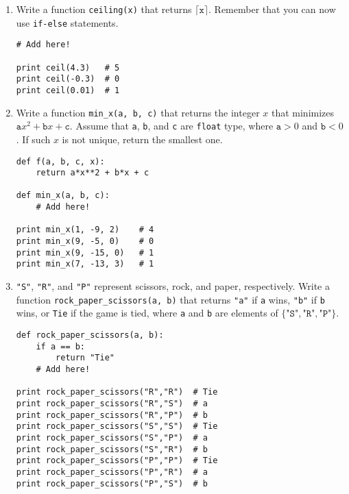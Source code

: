 \documentclass[../main.tex]{subfiles}
\begin{document}
\begin{enumerate}
\item Write a function \texttt{ceiling(x)} that returns $\lceil\texttt{x}\rceil$.
Remember that you can now use \texttt{if-else} statements.
\begin{verbatim}
# Add here!

print ceil(4.3)   # 5
print ceil(-0.3)  # 0
print ceil(0.01)  # 1
\end{verbatim}

\item Write a function \texttt{min\_x(a, b, c)} that returns the integer $x$ that minimizes $\texttt{a}x^2 + \texttt{b}x + \texttt{c}$.
Assume that \texttt{a}, \texttt{b}, and \texttt{c} are \texttt{float} type, where $\texttt{a} > 0$ and $\texttt{b} < 0$.
If such $x$ is not unique, return the smallest one.
\begin{verbatim}
def f(a, b, c, x):
	return a*x**2 + b*x + c

def min_x(a, b, c):
	# Add here!
	
print min_x(1, -9, 2)    # 4
print min_x(9, -5, 0)    # 0
print min_x(9, -15, 0)   # 1
print min_x(7, -13, 3)   # 1
\end{verbatim}

\item \texttt{"S"}, \texttt{"R"}, and \texttt{"P"} represent scissors, rock, and paper, respectively.
Write a function \texttt{rock\_paper\_scissors(a, b)} that returns \texttt{"a"} if \texttt{a} wins, \texttt{"b"} if \texttt{b} wins, or \texttt{Tie} if the game is tied, where \texttt{a} and \texttt{b} are elements of $\{\texttt{"S"}, \texttt{"R"}, \texttt{"P"}\}$.
\begin{verbatim}
def rock_paper_scissors(a, b):
	if a == b:
		return "Tie"
	# Add here!
	
print rock_paper_scissors("R","R")  # Tie
print rock_paper_scissors("R","S")  # a
print rock_paper_scissors("R","P")  # b
print rock_paper_scissors("S","S")  # Tie
print rock_paper_scissors("S","P")  # a
print rock_paper_scissors("S","R")  # b
print rock_paper_scissors("P","P")  # Tie
print rock_paper_scissors("P","R")  # a
print rock_paper_scissors("P","S")  # b
\end{verbatim}


\end{enumerate}
\end{document}

